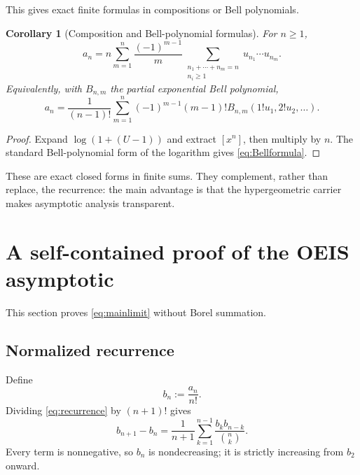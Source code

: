 \documentclass[11pt,a4paper]{article}
\newtheorem{corollary}[theorem]{Corollary}
\theoremstyle{definition}
\theoremstyle{remark}
\begin{document}
This gives exact finite formulas in compositions or Bell polynomials.

\begin{corollary}[Composition and Bell-polynomial formulas]\label{cor:exactformulas}
For \(n\ge1\),
\begin{equation}\label{eq:composition}
 a_n=n\sum_{m=1}^{n}\frac{(-1)^{m-1}}{m}
 \sum_{\substack{n_1+\cdots+n_m=n\\ n_i\ge1}}
 u_{n_1}\cdots u_{n_m}.
\end{equation}
Equivalently, with \(B_{n,m}\) the partial exponential Bell polynomial,
\begin{equation}\label{eq:Bellformula}
 a_n=\frac{1}{(n-1)!}
 \sum_{m=1}^{n}(-1)^{m-1}(m-1)!
 B_{n,m}(1!u_1,2!u_2,\ldots).
\end{equation}
\end{corollary}

\begin{proof}
Expand \(\log(1+(U-1))\) and extract \([x^n]\), then multiply by \(n\).  The standard Bell-polynomial form of the logarithm gives \eqref{eq:Bellformula}.
\end{proof}

These are exact closed forms in finite sums.  They complement, rather than replace, the recurrence: the main advantage is that the hypergeometric carrier makes asymptotic analysis transparent.

\section{A self-contained proof of the OEIS asymptotic}

This section proves \eqref{eq:mainlimit} without Borel summation.

\subsection{Normalized recurrence}

Define
\begin{equation}\label{eq:bn}
 b_n:=\frac{a_n}{n!}.
\end{equation}
Dividing \eqref{eq:recurrence} by \((n+1)!\) gives
\begin{equation}\label{eq:bnrecurrence}
 b_{n+1}-b_n
 =\frac{1}{n+1}\sum_{k=1}^{n-1}
   \frac{b_kb_{n-k}}{\binom{n}{k}}.
\end{equation}
Every term is nonnegative, so \(b_n\) is nondecreasing; it is strictly increasing from \(b_2\) onward.
\end{document}
